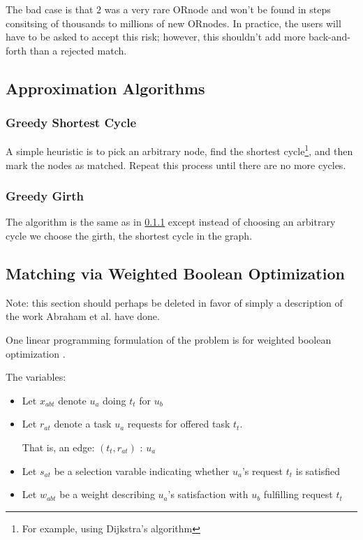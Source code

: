 \documentclass[main.tex]{subfiles}
\begin{document}
The bad case is that $2$ was a very rare ORnode and won't be found in steps consitsing of thousands to millions of new ORnodes. In practice, the users will have to be asked to accept this risk; however, this shouldn't add more back-and-forth than a rejected match.


\subsection{Approximation Algorithms}

\subsubsection{Greedy Shortest Cycle}\label{sec:gsc}
A simple heuristic is to pick an arbitrary node, find the shortest cycle\footnote{For example, using Dijkstra's algorithm}, and then mark the nodes as matched. Repeat this process until there are no more cycles.

\subsubsection{Greedy Girth}
The algorithm is the same as in \ref{sec:gsc} except instead of choosing an arbitrary cycle we choose the girth, the shortest cycle in the graph.

\subsection{Matching via Weighted Boolean Optimization}
Note: this section should perhaps be deleted in favor of simply a description of the work Abraham et al. \cite{Abr1} have done.

One linear programming formulation of the problem is for weighted boolean optimization \cite{Mar1}.

The variables:
\begin{itemize}
  \item Let $x_{abt}$ denote $u_a$ doing $t_t$ for $u_b$
  \item Let $r_{at}$ denote a task $u_a$ requests for offered task $t_t$.

        That is, an edge: $(t_t, r_{at})$ : $u_a$
  \item Let $s_{at}$ be a selection varable indicating whether $u_a$'s request $t_t$ is satisfied
  \item Let $w_{abt}$ be a weight describing $u_a$'s satisfaction with $u_b$ fulfilling request $t_t$
\end{itemize}
\end{document}
